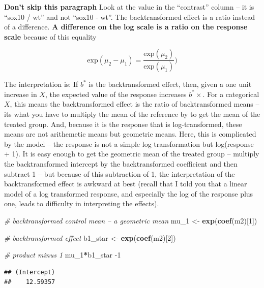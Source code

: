 \documentclass[]{book}
\newenvironment{Shaded}{\begin{snugshade}}{\end{snugshade}}
\newcommand{\CommentTok}[1]{\textcolor[rgb]{0.56,0.35,0.01}{\textit{#1}}}
\newcommand{\DecValTok}[1]{\textcolor[rgb]{0.00,0.00,0.81}{#1}}
\newcommand{\KeywordTok}[1]{\textcolor[rgb]{0.13,0.29,0.53}{\textbf{#1}}}
\newcommand{\NormalTok}[1]{#1}
\newcommand{\OperatorTok}[1]{\textcolor[rgb]{0.81,0.36,0.00}{\textbf{#1}}}
\newcommand{\StringTok}[1]{\textcolor[rgb]{0.31,0.60,0.02}{#1}}
\begin{document}
\textbf{Don't skip this paragraph} Look at the value in the ``contrast'' column -- it is ``sox10 / wt'' and not ``sox10 - wt''. The backtransformed effect is a ratio instead of a difference. \textbf{A difference on the log scale is a ratio on the response scale} because of this equality

\begin{equation}
\mathrm{exp}(\mu_2-\mu_1) = \frac{\mathrm{exp}(\mu_2)}{\mathrm{exp}(\mu_1)})
\end{equation}

The interpretation is: If \(b^*\) is the backtransformed effect, then, given a one unit increase in \(X\), the expected value of the response increases \(b^*\times\). For a categorical \(X\), this means the backtransformed effect is the ratio of backtransformed means -- its what you have to multiply the mean of the reference by to get the mean of the treated group. And, because it is the response that is log-transformed, these means are not arithemetic means but geometric means. Here, this is complicated by the model -- the response is not a simple log transformation but log(response + 1). It is easy enough to get the geometric mean of the treated group -- multiply the backtransformed intercept by the backtransformed coefficient and then subtract 1 -- but because of this subtraction of 1, the interpretation of the backtransformed effect is awkward at best (recall that I told you that a linear model of a log transformed response, and especially the log of the response plus one, leads to difficulty in interpreting the effects).

\begin{Shaded}
\begin{Highlighting}[]
\CommentTok{# backtransformed control mean -- a geometric mean}
\NormalTok{mu_}\DecValTok{1}\NormalTok{ <-}\StringTok{ }\KeywordTok{exp}\NormalTok{(}\KeywordTok{coef}\NormalTok{(m2)[}\DecValTok{1}\NormalTok{])}

\CommentTok{# backtransformed effect}
\NormalTok{b1_star <-}\StringTok{ }\KeywordTok{exp}\NormalTok{(}\KeywordTok{coef}\NormalTok{(m2)[}\DecValTok{2}\NormalTok{])}

\CommentTok{# product minus 1}
\NormalTok{mu_}\DecValTok{1}\OperatorTok{*}\NormalTok{b1_star }\DecValTok{-1}
\end{Highlighting}
\end{Shaded}

\begin{verbatim}
## (Intercept) 
##    12.59357
\end{verbatim}
\end{document}
